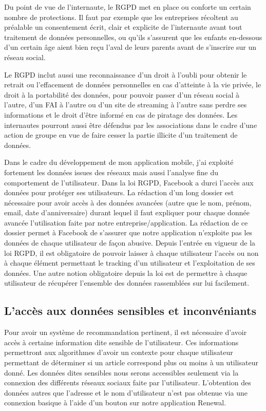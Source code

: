 Du point de vue de l’internaute, le RGPD met en place ou conforte un certain nombre de protections. Il faut par exemple que les entreprises récoltent au préalable un consentement écrit, clair et explicite de l’internaute avant tout traitement de données personnelles, ou qu’ils s’assurent que les enfants en-dessous d’un certain âge aient bien reçu l’aval de leurs parents avant de s’inscrire sur un réseau social.

Le RGPD inclut aussi une reconnaissance d’un droit à l’oubli pour obtenir le retrait ou l’effacement de données personnelles en cas d’atteinte à la vie privée, le droit à la portabilité des données, pour pouvoir passer d’un réseau social à l’autre, d’un FAI à l’autre ou d’un site de streaming à l’autre sans perdre ses informations et le droit d’être informé en cas de piratage des données. Les internautes pourront aussi être défendus par les associations dans le cadre d’une action de groupe en vue de faire cesser la partie illicite d’un traitement de données.

Dans le cadre du développement de mon application mobile, j'ai exploité fortement les données issues des réseaux mais aussi l’analyse fine du comportement de l’utilisateur. Dans la loi RGPD, Facebook a durci l’accès aux données pour protéger ses utilisateurs. La rédaction d’un long dossier est nécessaire pour avoir accès à des données avancées (autre que le nom, prénom, email, date d’anniversaire) durant lequel il faut expliquer pour chaque donnée avancée l’utilisation faite par notre entreprise/application.  La rédaction de ce dossier permet à Facebook de s’assurer que notre application n’exploite pas les données de chaque utilisateur de façon abusive. Depuis l’entrée en vigueur de la loi RGPD, il est obligatoire de pouvoir laisser à chaque utilisateur l’accès ou non à chaque élément permettant le tracking d’un utilisateur et l’exploitation de ses données. Une autre notion obligatoire depuis la loi est de permettre à chaque utilisateur de récupérer l’ensemble des données rassemblées sur lui facilement.


\subsection{L'accès aux données sensibles et inconvéniants }

Pour avoir un système de recommandation pertinent, il est nécessaire d'avoir accès à certaine information dite sensible de l’utilisateur. Ces informations permettront aux algorithmes d'avoir un contexte pour chaque utilisateur permettant de déterminer si un article correspond plus ou moins à un utilisateur donné. Les données dites sensibles nous serons accessibles seulement via la connexion des différents réseaux sociaux faite par l'utilisateur. L'obtention des données autres que l’adresse et le nom d'utilisateur n'est pas obtenue via une connexion basique à l'aide d'un bouton sur notre application Renewal. 


